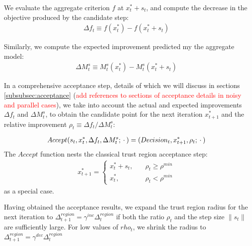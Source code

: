 We evaluate the aggregate criterion $f$ at $x^{*}_t+s_t$, and compute the decrease in the objective produced by the candidate step:
\begin{align}
    \Delta f_t\equiv f(x_t^*) - f(x_t^*+s_t)
    \label{eq:actual-improvement}
\end{align}

Similarly, we compute the expected improvement predicted my the aggregate model:
\begin{align}
    \Delta M^{s}_t\equiv M_t^s(x_t^*) - M_t^s(x_t^*+s_t)
    \label{eq:expected-improvement}
\end{align}

In a comprehensive acceptance step, details of which we will discuss in sections \ref{subsubsec:acceptance} (\textcolor{red}{add references to sections of acceptance details in noisy and parallel cases}), we take into account the actual and expected improvements $\Delta f_t$ and $\Delta M_t^s$, to obtain the candidate point for the next iteration $x_{t+1}^*$ and the relative improvement $\rho_t\equiv \Delta f_t/ \Delta M^s_t$:

\begin{align}
    Accept(s_t,x_t^{*},\Delta f_t,\Delta M_t^s;\hspace{0.2em}\cdot\hspace{0.2em})=(Decision_t,x_{t+1}^{*},\rho_t;\hspace{0.2em}\cdot\hspace{0.2em})
    \label{eq:acceptance-core}
\end{align}
The $Accept$ function nests the classical trust region acceptance step:
\begin{align}
    x_{t+1}^*=\begin{cases}
        x_t^*+s_t,\quad&\rho_t\geq\rho^{min}\\
        x_t^*,\quad&\rho_t<\rho^{min}
    \end{cases}
    \label{eq:accept-classic}
\end{align}
as a special case.

Having obtained the acceptance results, we expand the trust region radius for the next iteration to $\Delta_{t+1}^{region}=\gamma^{inc}\Delta_t^{region}$ if both the ratio $\rho_t$ and the step size $\lVert s_t\rVert$ are sufficiently large. For low values of $rho_t$, we shrink the radius to $\Delta^{region}_{t+1} = \gamma^{dec}\Delta_t^{region}$
